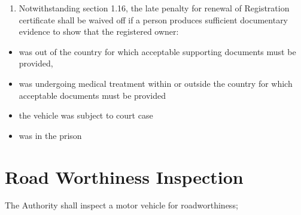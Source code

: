 \documentclass[
]{book}
\providecommand{\tightlist}{%
  \setlength{\itemsep}{0pt}\setlength{\parskip}{0pt}}
\begin{document}
\begin{enumerate}
\def\labelenumi{\alph{enumi}.}
\setcounter{enumi}{6}
\tightlist
\item
  Notwithstanding section 1.16, the late penalty for renewal of Registration certificate shall be waived off if a person produces sufficient documentary evidence to show that the registered owner:
\end{enumerate}

\begin{itemize}
\tightlist
\item
  was out of the country for which acceptable supporting documents must be provided,
\item
  was undergoing medical treatment within or outside the country for which acceptable documents must be provided
\item
  the vehicle was subject to court case
\item
  was in the prison
\end{itemize}

\hypertarget{road-worthiness-inspection}{%
\section{Road Worthiness Inspection}\label{road-worthiness-inspection}}

The Authority shall inspect a motor vehicle for roadworthiness;
\end{document}
